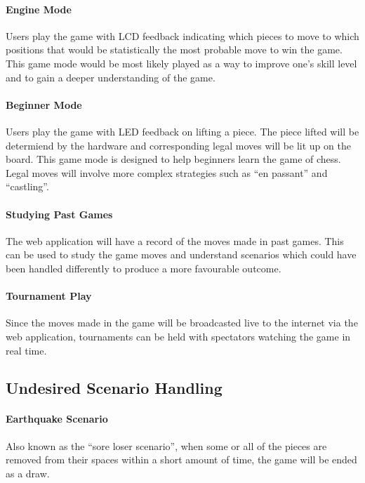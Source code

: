 \documentclass[12pt]{article}
\begin{document}
{{    \paragraph{Engine Mode}{
        Users play the game with LCD feedback indicating which pieces to move to which positions that would be statistically the most probable move to win the game. This game mode would
        be most likely played as a way to improve one's skill level and to gain a deeper understanding of the game.
    }
    
    \paragraph{Beginner Mode}{
        Users play the game with LED feedback on lifting a piece. The piece lifted will be determiend by the hardware and corresponding legal moves will be lit up on the board. This game
        mode is designed to help beginners learn the game of chess. Legal moves will involve more complex strategies such as ``en passant'' and ``castling''.
    }
        
    \paragraph{Studying Past Games}{
        The web application will have a record of the moves made in past games. This can be used to study the game moves and understand scenarios which could have been handled differently
        to produce a more favourable outcome.
    }
    
    \paragraph{Tournament Play}{
        Since the moves made in the game will be broadcasted live to the internet via the web application, tournaments can be held with spectators watching the game in real time.
    }
}

\subsection{Undesired Scenario Handling}{
    \paragraph{Earthquake Scenario}{
        Also known as the ``sore loser scenario'', when some or all of the pieces are removed from their spaces within a short amount of time, the game will be ended as a draw. 
    }
    
}}
\end{document}
